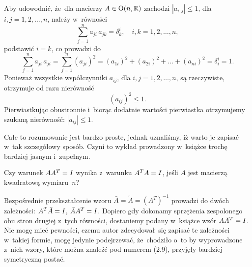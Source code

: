 \documentclass[a4paper,11pt]{article}
\begin{document}
\vspace{\spaceFour}





 Aby udowodnić, że~dla macierzy $A \in \mathbf{\mathrm{O}}( n, \mathbb{R} )$
zachodzi $| a_{ i, j } | \leq 1$, dla $i, j = 1, 2, \ldots, n$, należy w~równości
\begin{equation}
  \label{eq:Wojtynski-04}
  \sum_{ j = 1 }^{ n } a_{ j i } \, a_{ j k } = \delta_{ k }^{ i }, \quad
  i, k = 1, 2, \ldots, n,
\end{equation}
podstawić $i = k$, co prowadzi do
\begin{equation}
  \label{eq:Wojtynski-05}
  \sum_{ j = 1 }^{ n } a_{ j i } \, a_{ j i } =
  \sum_{ j = 1 }^{ n } ( a_{ j i } )^{ 2 } =
  ( a_{ 1 i } )^{ 2 } + ( a_{ 2 i } )^{ 2 } + \ldots + ( a_{ n i } )^{ 2 } =
  \delta^{ i }_{ i } = 1.
\end{equation}
Ponieważ wszystkie współczynniki $a_{ i j }$, dla $i, j = 1, 2, \ldots, n$, są
rzeczywiste, otrzymuje od razu nierówność
\begin{equation}
  \label{eq:Wojtynski-06}
  ( a_{ i j } )^{ 2 } \leq 1.
\end{equation}
Pierwiastkując obustronnie i~biorąc dodatnie wartości pierwiastka
otrzymujemy szukaną nierówność: $| a_{ i j } | \leq 1$.

Całe to rozumowanie jest bardzo proste, jednak uznaliśmy, iż warto je
zapisać w~tak szczegółowy sposób. Czyni to wykład prowadzony w~książce
trochę bardziej jasnym i~zupełnym.

\vspace{\spaceFour}





 Czy warunek $A A^{ T } = I$ wynika z~warunku
$A^{ T } A = I$, jeśli $A$ jest macierzą kwadratową wymiaru~$n$?

\vspace{\spaceFour}





 Bezpośrednie przekształcenie wzoru
$\bar{A} = \widetilde{A} = ( A^{ T } )^{ -1 }$ prowadzi do dwóch zależności:
$A^{ T } \bar{A} = I$, $\bar{A} A^{ T } = I$. Dopiero gdy
dokonamy sprzężenia zespolonego obu stron drugiej z~tych równości,
dostaniemy podany w~książce wzór $A \bar{A}^{ T } = I$. Nie mogę
mieć pewności, czemu autor zdecydował~się zapisać te zależności w~takiej
formie, mogę jedynie podejrzewać, że~chodziło o~to by wyprowadzone z~nich
wzory, które można znaleźć pod numerem (2.9), przyjęły bardziej symetryczną
postać.
\end{document}
